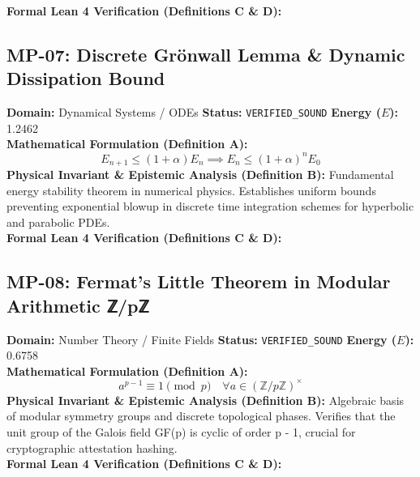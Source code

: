 \textbf{Formal Lean 4 Verification (Definitions C \& D):}


\vspace{1em}
\subsection{MP-07: Discrete Grönwall Lemma \& Dynamic Dissipation Bound}
\textbf{Domain:} Dynamical Systems / ODEs \hfill \textbf{Status:} \texttt{VERIFIED\_SOUND} \hfill \textbf{Energy ($E$):} 1.2462\\
\textbf{Mathematical Formulation (Definition A):}
\begin{equation*}
E_{n+1} \le (1 + \alpha) E_n \implies E_n \le (1 + \alpha)^n E_0
\end{equation*}
\textbf{Physical Invariant \& Epistemic Analysis (Definition B):}
Fundamental energy stability theorem in numerical physics. Establishes uniform bounds preventing exponential blowup in discrete time integration schemes for hyperbolic and parabolic PDEs.\\

\textbf{Formal Lean 4 Verification (Definitions C \& D):}


\vspace{1em}
\subsection{MP-08: Fermat's Little Theorem in Modular Arithmetic ℤ/pℤ}
\textbf{Domain:} Number Theory / Finite Fields \hfill \textbf{Status:} \texttt{VERIFIED\_SOUND} \hfill \textbf{Energy ($E$):} 0.6758\\
\textbf{Mathematical Formulation (Definition A):}
\begin{equation*}
a^{p-1} \equiv 1 \pmod p \quad \forall a \in (\mathbb{Z}/p\mathbb{Z})^\times
\end{equation*}
\textbf{Physical Invariant \& Epistemic Analysis (Definition B):}
Algebraic basis of modular symmetry groups and discrete topological phases. Verifies that the unit group of the Galois field GF(p) is cyclic of order p - 1, crucial for cryptographic attestation hashing.\\

\textbf{Formal Lean 4 Verification (Definitions C \& D):}


